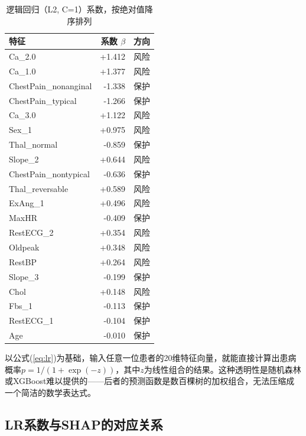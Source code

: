 \documentclass[12pt,a4paper]{ctexart}
\begin{document}
\begin{table}[H]
\centering
\caption{逻辑回归（L2, C=1）系数，按绝对值降序排列}
\label{tab:lr-coef}
\small
\begin{tabular}{lrr}
\toprule
\textbf{特征} & \textbf{系数 $\beta$} & \textbf{方向} \\
\midrule
Ca\_2.0              & +1.412 & 风险 \\
Ca\_1.0              & +1.377 & 风险 \\
ChestPain\_nonanginal & -1.338 & 保护 \\
ChestPain\_typical    & -1.266 & 保护 \\
Ca\_3.0              & +1.122 & 风险 \\
Sex\_1               & +0.975 & 风险 \\
Thal\_normal          & -0.859 & 保护 \\
Slope\_2             & +0.644 & 风险 \\
ChestPain\_nontypical & -0.636 & 保护 \\
Thal\_reversable      & +0.589 & 风险 \\
ExAng\_1             & +0.496 & 风险 \\
MaxHR                & -0.409 & 保护 \\
RestECG\_2           & +0.354 & 风险 \\
Oldpeak              & +0.348 & 风险 \\
RestBP               & +0.264 & 风险 \\
Slope\_3             & -0.199 & 保护 \\
Chol                 & +0.148 & 风险 \\
Fbs\_1               & -0.113 & 保护 \\
RestECG\_1           & -0.104 & 保护 \\
Age                  & -0.010 & 保护 \\
\bottomrule
\end{tabular}
\end{table}

以公式(\ref{eq:lr})为基础，输入任意一位患者的20维特征向量，就能直接计算出患病概率$p = 1/(1 + \exp(-z))$，其中$z$为线性组合的结果。这种透明性是随机森林或XGBoost难以提供的——后者的预测函数是数百棵树的加权组合，无法压缩成一个简洁的数学表达式。

\subsection{LR系数与SHAP的对应关系}
\end{document}
